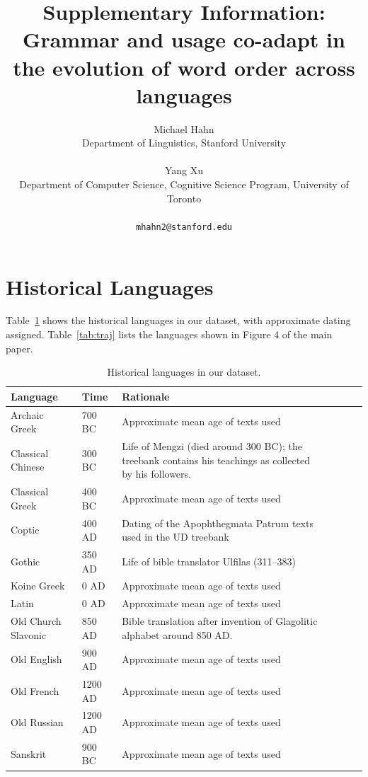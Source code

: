 \documentclass[11pt,a4paper]{article}
\title{Supplementary Information: Grammar and usage co-adapt in the evolution of word order across languages}
\author{Michael Hahn\\Department of Linguistics, Stanford University\\\\Yang Xu\\ Department of Computer Science, Cognitive Science Program, University of Toronto\\\\ \texttt{mhahn2@stanford.edu}}
\date{}
\begin{document}
\maketitle

\tableofcontents

\section{Historical Languages}

Table~\ref{tab:historical} shows the historical languages in our dataset, with approximate dating assigned.
Table~\ref{tab:traj} lists the languages shown in Figure 4 of the main paper.

\begin{table}
\begin{longtable}{llp{10cm}llll}
Language & Time & Rationale \\ \hline
Archaic Greek & 700 BC & Approximate mean age of texts used \\
Classical Chinese & 300 BC & Life of Mengzi (died around 300 BC); the treebank contains his teachings as collected by his followers. \\
Classical Greek & 400 BC & Approximate mean age of texts used \\
Coptic & 400 AD & Dating of the Apophthegmata Patrum texts used in the UD treebank\\
Gothic & 350 AD & Life of bible translator Ulfilas (311--383)\\
Koine Greek & 0 AD  & Approximate mean age of texts used\\
Latin & 0 AD & Approximate mean age of texts used \\
Old Church Slavonic & 850 AD &  Bible translation after invention of Glagolitic alphabet around 850 AD. \\
Old English & 900 AD & Approximate mean age of texts used \\
Old French & 1200 AD  & Approximate mean age of texts used\\
Old Russian & 1200 AD & Approximate mean age of texts used\\
Sanskrit & 900 BC & Approximate mean age of texts used \\
\end{longtable}
	\caption{Historical languages in our dataset.}\label{tab:historical}
\end{table}
\end{document}
